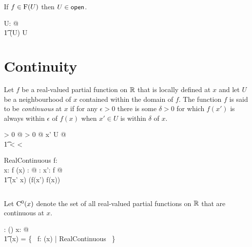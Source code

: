 \documentclass[11pt, oneside]{article}
\begin{document}
\begin{remark}
If $f \in \operatorname{F}(U)$ then $U \in \mathsf{open}$.

\begin{zed}
	\forall U: \power \R @ \\
	\t1	\FunPR(U) \neq \emptyset \implies U \in \openR
\end{zed}

\end{remark}

\section{Continuity}

Let $f$ be a real-valued partial function on $\mathbb{R}$ 
that is locally defined at $x$ and let $U$ be a neighbourhood of $x$
contained within the domain of $f$.
The function $f$ is said to be {\it continuous} at $x$ if 
for any $\epsilon > 0$ there is some $\delta > 0$ for which 
$f(x')$ is always within $\epsilon$ of $f(x)$
when $x' \in U$ is within $\delta$ of $x$.
\begin{argue}
\forall \epsilon > 0 @ \exists \delta > 0 @ \forall x' \in U @ \\
\t1	 < \delta \implies {} < \epsilon
\end{argue}

\begin{schema}{RealContinuous}
	f: \R \pfun \R \\
	x: \R
\where
	f \in \FunR(x)
\also
	\forall \epsilon: \Rpos @ \exists \delta: \Rpos@ \forall x': \dom f @ \\
	\t1	\absR(x' \subR x) \ltR \delta \implies \absR(f(x') \subR f(x)) \ltR \epsilon
\end{schema}

\subsection{}

Let $\operatorname{C^0}(x)$ denote the set of all real-valued partial functions on $\mathbb{R}$ that are continuous at $x$.
\begin{axdef}
	\CzeroR: \R \fun \power(\R \pfun \R)
\where
	\forall x: \R @ \\
	\t1	\CzeroR(x) = \{~ f: \FunR(x) | RealContinuous ~\}
\end{axdef}

\subsection{}
\end{document}
